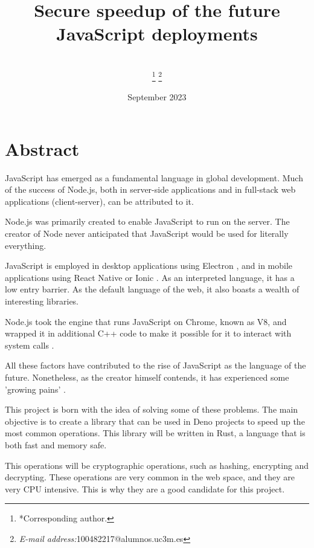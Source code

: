 \documentclass[10pt,journal,compsoc]{IEEEtran}
\begin{document}
\title{Secure speedup of the future JavaScript deployments}
\author{\\
    \thanks{*Corresponding author.}%
    \thanks{\textit{E-mail address:}100482217@alumnos.uc3m.es}}

\date{September 2023}
\maketitle
\section{Abstract}
JavaScript has emerged as a fundamental language in global development. Much of the success of Node.js, both in server-side applications and in full-stack web applications (client-server), can be attributed to it.

Node.js was primarily created to enable JavaScript to run on the server. The creator of Node never anticipated that JavaScript would be used for literally everything.

JavaScript is employed in desktop applications using Electron \cite{ELECTRON}, and in mobile applications using React Native \cite{RN} or Ionic \cite{IONIC}. As an interpreted language, it has a low entry barrier. As the default language of the web, it also boasts a wealth of interesting libraries.

Node.js took the engine that runs JavaScript on Chrome, known as V8, and wrapped it in additional C++ code to make it possible for it to interact with system calls \cite{FKNODE}.

All these factors have contributed to the rise of JavaScript as the language of the future. Nonetheless, as the creator himself contends, it has experienced some 'growing pains' \cite{FKNODE}.

This project is born with the idea of solving some of these problems. The main objective is to create a library that can be used in Deno projects to speed up the most common operations. This library will be written in Rust, a language that is both fast and memory safe.

This operations will be cryptographic operations, such as hashing, encrypting and decrypting. These operations are very common in the web space, and they are very CPU intensive. This is why they are a good candidate for this project.
\end{document}
